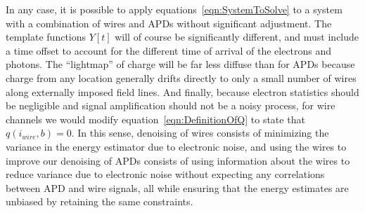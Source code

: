 In any case, it is possible to apply equations~\ref{eqn:SystemToSolve} to a system with a combination of wires and APDs without significant adjustment.  The template functions $Y[t]$ will of course be significantly different, and must include a time offset to account for the different time of arrival of the electrons and photons.  The ``lightmap'' of charge will be far less diffuse than for APDs because charge from any location generally drifts directly to only a small number of wires along externally imposed field lines.  And finally, because electron statistics should be negligible and signal amplification should not be a noisy process, for wire channels we would modify equation~\ref{eqn:DefinitionOfQ} to state that $q(i_{wire}, b) = 0$.  In this sense, denoising of wires consists of minimizing the variance in the energy estimator due to electronic noise, and using the wires to improve our denoising of APDs consists of using information about the wires to reduce variance due to electronic noise without expecting any correlations between APD and wire signals, all while ensuring that the energy estimates are unbiased by retaining the same constraints.
